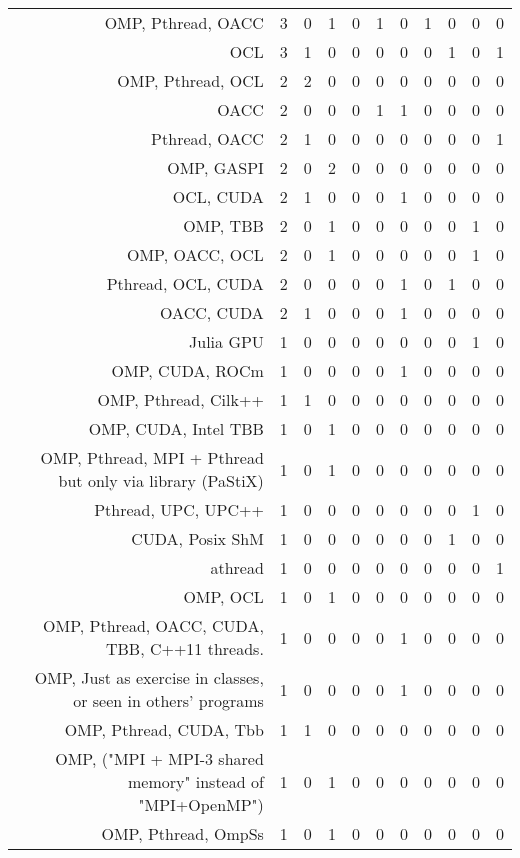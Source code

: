 {\begin{landscape}
\begin{longtable}[htb]{r|c|c|c|c|c|c|c|c|c|c}
{OMP, Pthread, OACC} & 3 & 0 & 1 & 0 & 1 & 0 & 1 & 0 & 0 & 0 \\%
{OCL} & 3 & 1 & 0 & 0 & 0 & 0 & 0 & 1 & 0 & 1 \\%
{OMP, Pthread, OCL} & 2 & 2 & 0 & 0 & 0 & 0 & 0 & 0 & 0 & 0 \\%
{OACC} & 2 & 0 & 0 & 0 & 1 & 1 & 0 & 0 & 0 & 0 \\%
{Pthread, OACC} & 2 & 1 & 0 & 0 & 0 & 0 & 0 & 0 & 0 & 1 \\%
{OMP, GASPI} & 2 & 0 & 2 & 0 & 0 & 0 & 0 & 0 & 0 & 0 \\%
{OCL, CUDA} & 2 & 1 & 0 & 0 & 0 & 1 & 0 & 0 & 0 & 0 \\%
{OMP, TBB} & 2 & 0 & 1 & 0 & 0 & 0 & 0 & 0 & 1 & 0 \\%
{OMP, OACC, OCL} & 2 & 0 & 1 & 0 & 0 & 0 & 0 & 0 & 1 & 0 \\%
{Pthread, OCL, CUDA} & 2 & 0 & 0 & 0 & 0 & 1 & 0 & 1 & 0 & 0 \\%
{OACC, CUDA} & 2 & 1 & 0 & 0 & 0 & 1 & 0 & 0 & 0 & 0 \\%
{Julia GPU} & 1 & 0 & 0 & 0 & 0 & 0 & 0 & 0 & 1 & 0 \\%
{OMP, CUDA, ROCm} & 1 & 0 & 0 & 0 & 0 & 1 & 0 & 0 & 0 & 0 \\%
{OMP, Pthread, Cilk++} & 1 & 1 & 0 & 0 & 0 & 0 & 0 & 0 & 0 & 0 \\%
{OMP, CUDA, Intel TBB} & 1 & 0 & 1 & 0 & 0 & 0 & 0 & 0 & 0 & 0 \\%
{OMP, Pthread, MPI + Pthread but only via library (PaStiX)} & 1 & 0 & 1 & 0 & 0 & 0 & 0 & 0 & 0 & 0 \\%
{Pthread, UPC, UPC++} & 1 & 0 & 0 & 0 & 0 & 0 & 0 & 0 & 1 & 0 \\%
{CUDA, Posix ShM} & 1 & 0 & 0 & 0 & 0 & 0 & 0 & 1 & 0 & 0 \\%
{athread} & 1 & 0 & 0 & 0 & 0 & 0 & 0 & 0 & 0 & 1 \\%
{OMP, OCL} & 1 & 0 & 1 & 0 & 0 & 0 & 0 & 0 & 0 & 0 \\%
{OMP, Pthread, OACC, CUDA, TBB, C++11 threads.} & 1 & 0 & 0 & 0 & 0 & 1 & 0 & 0 & 0 & 0 \\%
{OMP, Just as exercise in classes, or seen in others' programs} & 1 & 0 & 0 & 0 & 0 & 1 & 0 & 0 & 0 & 0 \\%
{OMP, Pthread, CUDA, Tbb} & 1 & 1 & 0 & 0 & 0 & 0 & 0 & 0 & 0 & 0 \\%
{OMP, ("MPI + MPI-3 shared memory" instead of "MPI+OpenMP")} & 1 & 0 & 1 & 0 & 0 & 0 & 0 & 0 & 0 & 0 \\%
{OMP, Pthread, OmpSs} & 1 & 0 & 1 & 0 & 0 & 0 & 0 & 0 & 0 & 0 \\%

\end{longtable}
\end{landscape}}
